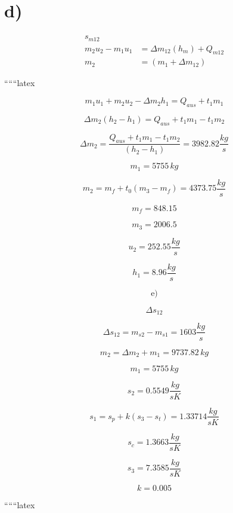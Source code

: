 \section*{d)}
\begin{align*}
s_{m12} \\
m_2 u_2 - m_1 u_1 &= \Delta m_{12} (h_m) + Q_{m12} \\
m_2 &= (m_1 + \Delta m_{12})
\end{align*}

``````latex


\[
m_1 u_1 + m_2 u_2 - \Delta m_2 h_1 = Q_{aus} + t_1 m_1
\]

\[
\Delta m_2 (h_2 - h_1) = Q_{aus} + t_1 m_1 - t_1 m_2
\]

\[
\Delta m_2 = \frac{Q_{aus} + t_1 m_1 - t_1 m_2}{(h_2 - h_1)} = 3982.82 \frac{kg}{s}
\]

\[
m_1 = 5755 \, kg
\]

\[
m_2 = m_f + t_0 (m_3 - m_f) = 4373.75 \frac{kg}{s}
\]

\[
m_f = 848.15
\]

\[
m_3 = 2006.5
\]

\[
u_2 = 252.55 \frac{kg}{s}
\]

\[
h_1 = 8.96 \frac{kg}{s}
\]

\[
\text{e)}
\]

\[
\Delta s_{12}
\]

\[
\Delta s_{12} = m_{s2} - m_{s1} = 1603 \frac{kg}{s}
\]

\[
m_2 = \Delta m_2 + m_1 = 9737.82 \, kg
\]

\[
m_1 = 5755 \, kg
\]

\[
s_2 = 0.5549 \frac{kg}{sK}
\]

\[
s_1 = s_p + k(s_3 - s_t) = 1.33714 \frac{kg}{sK}
\]

\[
s_c = 1.3663 \frac{kg}{sK}
\]

\[
s_3 = 7.3585 \frac{kg}{sK}
\]

\[
k = 0.005
\]

``````latex


